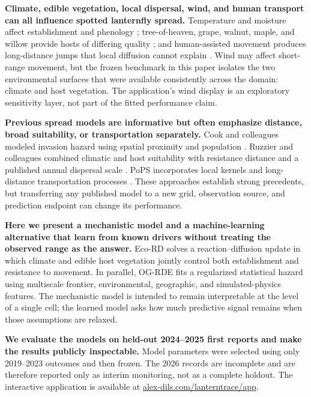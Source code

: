 \documentclass{article}
\begin{document}
\textbf{Climate, edible vegetation, local dispersal, wind, and human transport can all influence spotted lanternfly spread.} Temperature and moisture affect establishment and phenology \cite{wakie2020,barker2025}; tree-of-heaven, grape, walnut, maple, and willow provide hosts of differing quality \cite{nixon2020}; and human-assisted movement produces long-distance jumps that local diffusion cannot explain \cite{ladin2023}. Wind may affect short-range movement, but the frozen benchmark in this paper isolates the two environmental surfaces that were available consistently across the domain: climate and host vegetation. The application's wind display is an exploratory sensitivity layer, not part of the fitted performance claim.

\textbf{Previous spread models are informative but often emphasize distance, broad suitability, or transportation separately.} Cook and colleagues modeled invasion hazard using spatial proximity and population \cite{cook2021}. Ruzzier and colleagues combined climatic and host suitability with resistance distance and a published annual dispersal scale \cite{ruzzier2025}. PoPS incorporates local kernels and long-distance transportation processes \cite{jones2022}. These approaches establish strong precedents, but transferring any published model to a new grid, observation source, and prediction endpoint can change its performance.

\textbf{Here we present a mechanistic model and a machine-learning alternative that learn from known drivers without treating the observed range as the answer.} Eco-RD solves a reaction--diffusion update in which climate and edible host vegetation jointly control both establishment and resistance to movement. In parallel, OG-RDE fits a regularized statistical hazard using multiscale frontier, environmental, geographic, and simulated-physics features. The mechanistic model is intended to remain interpretable at the level of a single cell; the learned model asks how much predictive signal remains when those assumptions are relaxed.

\textbf{We evaluate the models on held-out 2024--2025 first reports and make the results publicly inspectable.} Model parameters were selected using only 2019--2023 outcomes and then frozen. The 2026 records are incomplete and are therefore reported only as interim monitoring, not as a complete holdout. The interactive application is available at \href{https://www.alex-dils.com/lanterntrace/app/}{alex-dils.com/lanterntrace/app}.
\end{document}
